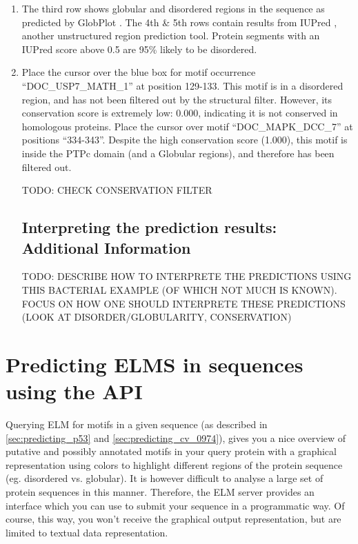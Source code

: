\documentclass[12pt]{article}
\begin{document}
\begin{enumerate}
\item The third row shows globular and disordered regions in the sequence as
	predicted by GlobPlot \citep{12824398}. The 4th \& 5th rows contain
	results from IUPred \citep{15955779}, another unstructured region
	prediction tool. Protein segments with an IUPred score above 0.5 are
	95\% likely to be disordered.  

\item Place the cursor over the blue box for motif occurrence
	``DOC\_USP7\_MATH\_1'' at position 129-133. This motif is in a
	disordered region, and has not been filtered out by the structural
	filter. However, its conservation score is extremely low: 0.000,
	indicating it is not conserved in homologous proteins. Place the cursor
	over motif ``DOC\_MAPK\_DCC\_7'' at positions ``334-343''. Despite the
	high conservation score (1.000), this motif is inside the PTPc domain
	(and a Globular regions), and therefore has been filtered out.

TODO: CHECK CONSERVATION FILTER

%
%
\subsection*{Interpreting the prediction results: Additional Information}
\label{subsec:predicting_cv_0974_additional_information}

TODO: DESCRIBE HOW TO INTERPRETE THE PREDICTIONS USING THIS BACTERIAL
EXAMPLE (OF WHICH NOT MUCH IS KNOWN). FOCUS ON HOW ONE SHOULD INTERPRETE
THESE PREDICTIONS (LOOK AT DISORDER/GLOBULARITY, CONSERVATION)

\end{enumerate}

\clearpage

\section{Predicting ELMS in sequences using the API}
\label{sec:predicting_REST}

Querying ELM for motifs in a given sequence (as described in
\ref{sec:predicting_p53} and \ref{sec:predicting_cv_0974}), gives you a nice
overview of putative and possibly
annotated motifs in your query protein with a graphical representation
using colors to highlight different regions of the protein sequence (eg.
disordered vs. globular). It is however difficult to analyse a large set
of protein sequences in this manner. Therefore, the ELM server
provides an interface which you can use to submit your sequence in a
programmatic way. Of course, this way, you won't receive the graphical
output representation, but are limited to textual data representation.
\end{document}
